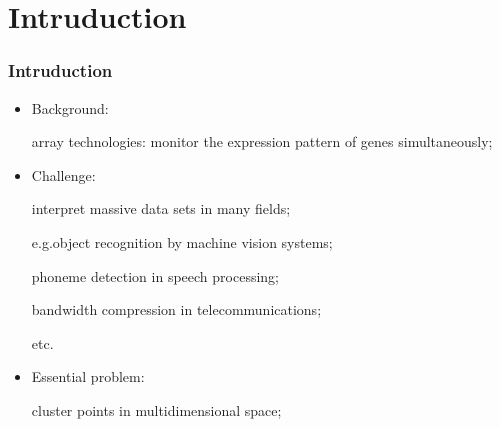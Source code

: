 \section{Intruduction}
\begin{frame}
\sectionpage
\end{frame}

\begin{frame}
    \frametitle{Intruduction}
    \begin{itemize}
        \item Background:
        
        array technologies: monitor the expression pattern of genes simultaneously;

        \item Challenge:
        
        interpret massive data sets in many fields;
        
        e.g.object recognition by machine vision systems;

        \hspace{1.2em} phoneme detection in speech processing;

        \hspace{1.3em} bandwidth compression in telecommunications;

        \hspace{1.3em} etc.

        \item Essential problem:
        
        cluster points in multidimensional space;
    \end{itemize}
\end{frame}






       


